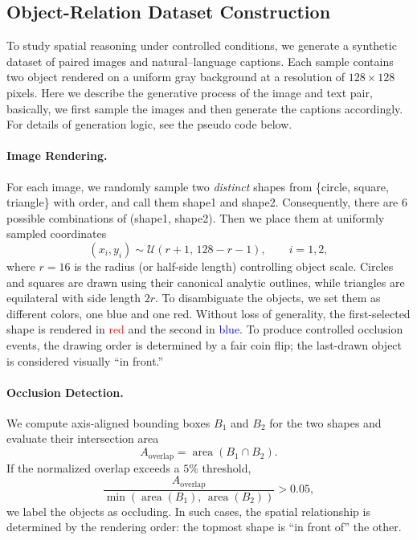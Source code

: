 \documentclass[10pt,twocolumn,letterpaper]{article}
\begin{document}
\subsection{Object-Relation Dataset Construction}\label{method:dataset}

To study spatial reasoning under controlled conditions, we generate a synthetic dataset of paired images and natural–language captions. Each sample contains two object rendered on a uniform gray background at a resolution of $128\times 128$ pixels. Here we describe the generative process of the image and text pair, basically, we first sample the images and then generate the captions accordingly. For details of generation logic, see the pseudo code below. 

\paragraph{Image Rendering.}
For each image, we randomly sample two \textit{distinct} shapes from \{circle, square, triangle\} with order, and call them shape1 and shape2. Consequently, there are 6 possible combinations of (shape1, shape2). 
Then we place them at uniformly sampled coordinates
\[
(x_i, y_i) \sim \mathcal{U}(r+1,\, 128-r-1), \qquad i=1,2,
\]
where $r=16$ is the radius (or half-side length) controlling object scale. Circles and squares are drawn using their canonical analytic outlines, while triangles are equilateral with side length $2r$. 
To disambiguate the objects, we set them as different colors, one blue and one red. Without loss of generality, the first-selected shape is rendered in \textcolor{red}{red} and the second in \textcolor{blue}{blue}. 
To produce controlled occlusion events, the drawing order is determined by a fair coin flip; the last-drawn object is considered visually ``in front.''

\paragraph{Occlusion Detection.}
We compute axis-aligned bounding boxes $B_1$ and $B_2$ for the two shapes and evaluate their intersection area
\[
A_{\text{overlap}} = \operatorname{area}(B_1 \cap B_2).
\]
If the normalized overlap exceeds a $5\%$ threshold,
\[
\frac{A_{\text{overlap}}}{\min(\operatorname{area}(B_1),\,\operatorname{area}(B_2))} > 0.05,
\]
we label the objects as occluding. In such cases, the spatial relationship is determined by the rendering order: the topmost shape is ``in front of'' the other.
\end{document}
